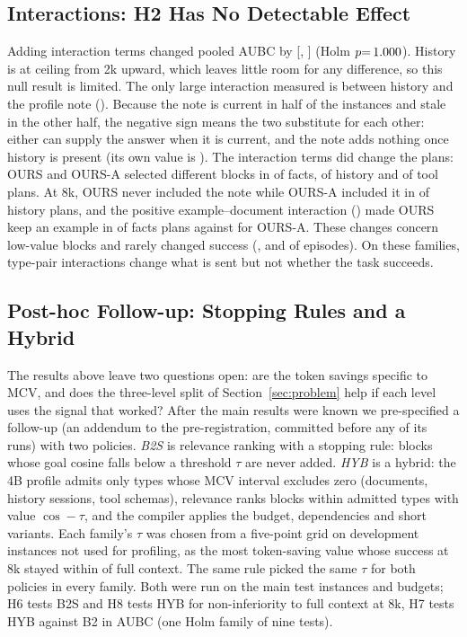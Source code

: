 \subsection{Interactions: H2 Has No Detectable Effect}
Adding interaction terms changed pooled AUBC by \RHTwoPooledDiff{} [\RHTwoPooledLo, \RHTwoPooledHi] (Holm
$p{=}\,1.000$). History is at ceiling from 2k upward, which leaves little room for any difference, so this null result is limited. The
only large interaction measured is between history and the profile note (\RIntHistoryHistoryTurnNote). Because the note
is current in half of the instances and stale in the other half, the negative sign means the two substitute for each
other: either can supply the answer when it is current, and the note adds nothing once history is present (its own
value is \RMcvHistoryNote). The interaction terms did change the plans: OURS and OURS-A
selected different blocks in \RSelDiffFacts of facts, \RSelDiffHistory of history and \RSelDiffTool of tool plans.
At 8k, OURS never included the note while OURS-A included it in \RHasNoteAdditiveHistory of history plans, and the
positive example--document interaction (\RIntFactsExampleFact) made OURS keep an example in \RHasExampleOursFacts of
facts plans against \RHasExampleAdditiveFacts for OURS-A. These changes concern low-value blocks and rarely changed
success (\RSelOutcomeDiffFacts, \RSelOutcomeDiffHistory and \RSelOutcomeDiffTool of episodes). On these families, type-pair interactions change what is sent but not whether the task succeeds.

\subsection{Post-hoc Follow-up: Stopping Rules and a Hybrid}
The results above leave two questions open: are the token savings specific to MCV, and does the three-level split of
Section~\ref{sec:problem} help if each level uses the signal that worked? After the main results were known we
pre-specified a follow-up (an addendum to the pre-registration, committed before any of its runs) with two policies.
\emph{B2S} is relevance ranking with a stopping rule: blocks whose goal cosine falls below a threshold $\tau$ are never
added. \emph{HYB} is a hybrid: the 4B profile admits only types whose MCV interval excludes zero (documents, history
sessions, tool schemas), relevance ranks blocks within admitted types with value $\cos-\tau$, and the compiler applies the
budget, dependencies and short variants. Each family's $\tau$ was chosen from a five-point grid on \RNCalib development
instances not used for profiling, as the most token-saving value whose success at 8k stayed within \RMargin of full
context. The same rule picked the same $\tau$ for both policies in every family. Both were run on the main test instances
and budgets; H6 tests B2S and H8 tests HYB for non-inferiority to full context at 8k, H7 tests HYB against B2 in AUBC
(one Holm family of nine tests).

